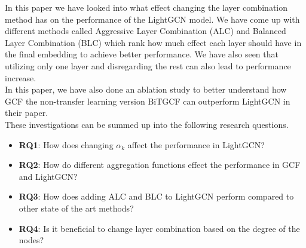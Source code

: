 In this paper we have looked into what effect changing the layer combination method has on the performance of the LightGCN model.
We have come up with different methods called Aggressive Layer Combination (ALC) and Balanced Layer Combination (BLC) which rank how much effect each layer should have in the final embedding to achieve better performance.
We have also seen that utilizing only one layer and disregarding the rest can also lead to performance increase.
\\
In this paper, we have also done an ablation study to better understand how GCF the non-transfer learning version BiTGCF can outperform LightGCN in their paper.
\\
These investigations can be summed up into the following research questions.
\begin{itemize}
    \item \textbf{RQ1}: How does changing $\alpha_k$ affect the performance in LightGCN?
    \item \textbf{RQ2}: How do different aggregation functions effect the performance in GCF and LightGCN?
    \item \textbf{RQ3}: How does adding ALC and BLC to LightGCN perform compared to other state of the art methods?
    \item \textbf{RQ4}: Is it beneficial to change layer combination based on the degree of the nodes?
\end{itemize}
